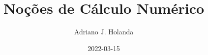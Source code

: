 \documentclass{beamer}
\begin{document}
\title{Noções de Cálculo Numérico}
\author{Adriano J. Holanda}
\date{2022-03-15}



%
%
\end{document}
